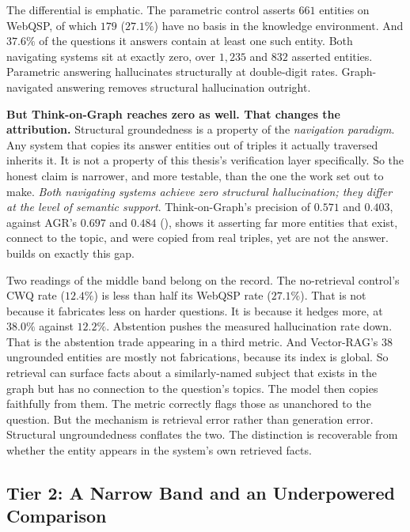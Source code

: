 The differential is emphatic. The parametric control asserts $661$ entities
on WebQSP, of which $179$ ($27.1\%$)
have no basis in the knowledge environment. And $37.6\%$ of the questions it
answers contain at least one such entity. Both navigating systems sit at exactly
zero, over $1{,}235$ and $832$ asserted entities. Parametric answering
hallucinates structurally at double-digit rates. Graph-navigated answering
removes structural hallucination outright.

\textbf{But Think-on-Graph reaches zero as well. That changes the attribution.}
Structural groundedness is a property of the \emph{navigation paradigm}. Any
system that copies its answer entities out of triples it actually traversed
inherits it. It is not a property of this thesis's verification layer
specifically. So the honest claim is narrower, and more testable, than the one
the work set out to make. \emph{Both navigating systems achieve zero structural
hallucination; they differ at the level of semantic support}. Think-on-Graph's
precision of $0.571$ and $0.403$, against AGR's $0.697$ and $0.484$
(), shows it asserting far more entities that exist, connect to
the topic, and were copied from real triples, yet are not the answer.
 builds on exactly this gap.

Two readings of the middle band belong on the record. The no-retrieval control's
CWQ rate ($12.4\%$) is less than half its WebQSP rate ($27.1\%$). That is not
because it fabricates less on harder questions. It is because it hedges more, at
$38.0\%$ against $12.2\%$. Abstention pushes the measured hallucination rate
down. That is the abstention trade appearing in a third metric. And Vector-RAG's
$38$ ungrounded entities are mostly not fabrications, because its index is
global. So retrieval can surface facts about a similarly-named subject that
exists in the graph but has no connection to the question's topics. The model
then copies faithfully from them. The metric correctly flags those as unanchored
to the question. But the mechanism is retrieval error rather than generation
error. Structural ungroundedness conflates the two. The distinction is
recoverable from whether the entity appears in the system's own retrieved facts.

\subsection{Tier 2: A Narrow Band and an Underpowered Comparison}

